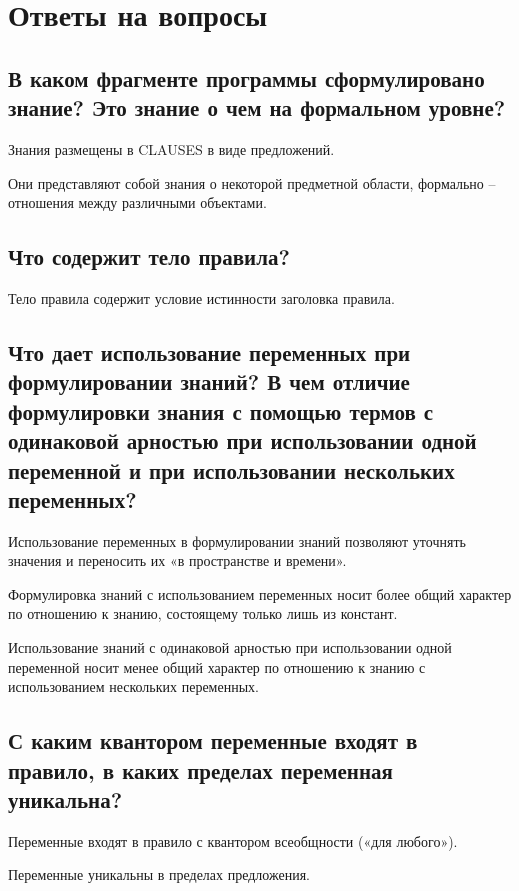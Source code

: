 \documentclass[a4paper,12pt]{article}
\begin{document}
	\newpage
	
	\section*{Ответы на вопросы}
	
	\subsection*{В каком фрагменте программы сформулировано знание? Это знание о чем на формальном уровне?}
	
	Знания размещены в CLAUSES в виде предложений.
	
	Они представляют собой знания о некоторой предметной области, формально – отношения между различными объектами.
	
	\subsection*{Что содержит тело правила?}
	
	Тело правила содержит условие истинности заголовка правила.
	
	\subsection*{Что дает использование переменных при формулировании знаний? В чем отличие формулировки знания с помощью термов с одинаковой арностью при использовании одной переменной и при использовании нескольких переменных?}
	
	Использование переменных в формулировании знаний позволяют уточнять значения и переносить их «в пространстве и времени».
	
	 Формулировка знаний с использованием переменных носит более общий характер по отношению к знанию, состоящему только лишь из констант.
	 
	  Использование знаний с одинаковой арностью при использовании одной переменной носит менее общий характер по отношению к знанию с использованием нескольких переменных.
	
	\subsection*{С каким квантором переменные входят в правило, в каких пределах переменная уникальна?}
	
	Переменные входят в правило с квантором всеобщности («для любого»).
	
	Переменные уникальны в пределах предложения.
	
\end{document}
